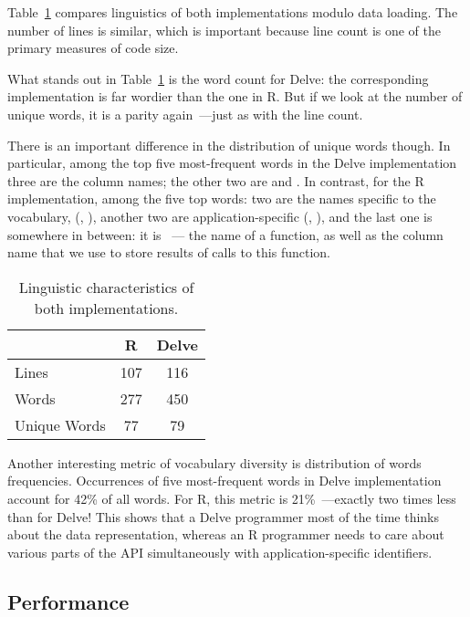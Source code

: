 Table~\ref{tab1-lingua} compares linguistics of both implementations modulo data
loading. The number of lines is similar, which is important because line count
is one of the primary measures of code size.

What stands out in Table~\ref{tab1-lingua} is the word count for Delve: the
corresponding implementation is far wordier than the one in R. But if we look
at the number of unique words, it is a parity again~---just as with the line count.

There is an important difference in the distribution of unique words though.
In particular, among the top five most-frequent words in the Delve
implementation three are the column names; the other two are  and .
In contrast, for the R implementation, among the five top words: two are the
names specific to the \dplyr vocabulary, (, ), another two
are application-specific (, ), and the last one is somewhere in
between: it is ~--- the name of a \dplyr function, as well as the column name
that we use to store results of calls to this function.

\begin{table}
\setlength{\tabcolsep}{12pt}
\caption{Linguistic characteristics of both implementations.}\label{tab1-lingua}
\centering
\begin{tabular}{lcc}
\toprule
              &  R      & Delve \\
\midrule
Lines         & 107     & 116\\
Words         & 277     & 450\\
Unique Words  &  77     & 79 \\
\bottomrule
\end{tabular}
\end{table}

Another interesting metric of vocabulary diversity is distribution of
words frequencies.
Occurrences of five most-frequent words in Delve implementation account
for 42\% of all words.
For R, this metric is 21\%~---exactly two times less than for Delve! This
shows that a Delve programmer most of the time thinks about the data representation,
whereas an R programmer needs to care about various parts of the API simultaneously
with application-specific identifiers.

\subsection{Performance}

